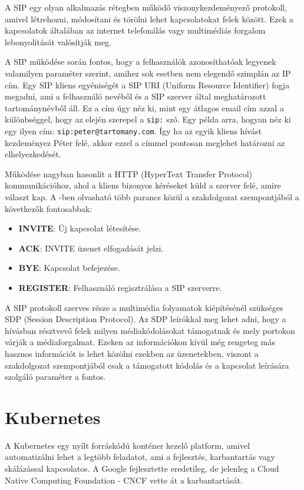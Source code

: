 A SIP egy olyan alkalmazás rétegben működő viszonykezdeményező protokoll, amivel 
létrehozni, módosítani és törölni lehet kapcsolatokat felek között. Ezek a kapcsolatok 
általában az internet telefonálás vagy multimédiás forgalom lebonyolítását valósítják meg. 

A SIP működése során fontos, hogy a felhasználók azonosíthatóak legyenek valamilyen
paraméter szerint, amihez sok esetben nem elegendő szimplán az IP cím. Egy 
SIP kliens egyéniségét a SIP URI (Uniform Resource Identifier) fogja megadni, ami
a  felhasználó nevéből és a SIP szerver által meghatározott tartománynévből áll.
Ez a cím úgy néz ki, mint egy átlagos email cím azzal a különbséggel, hogy az 
elején szerepel a \texttt{sip:} szó. Egy példa arra, hogyan néz ki egy ilyen cím: 
\texttt{sip:peter@tartomany.com}. Így ha az egyik kliens hívást kezdeményez Péter felé,
akkor ezzel a címmel pontosan meglehet határozni az elhelyezkedését. 

Működése nagyban hasonlít a HTTP (HyperText Transfer Protocol) kommunikációhoz, ahol 
a kliens bizonyos kéréseket küld a szerver felé, amire választ kap. A \cite{RFC3261}-ben
olvasható több parancs közül a szakdolgozat szempontjából a következők fontosabbak: 

\begin{itemize}
	\item \textbf{INVITE}: Új kapcsolat létesítése.
	\item \textbf{ACK}: INVITE üzenet elfogadását jelzi. 
	\item \textbf{BYE}: Kapcsolat befejezése. 
	\item \textbf{REGISTER}: Felhasználó regisztrálása a SIP szerverre. 
\end{itemize}

A SIP protokoll szerves része a multimédia folyamatok kiépítésénél szükséges SDP (Session 
Description Protocol). Az SDP leírókkal meg lehet adni, hogy a hívásban résztvevő felek 
milyen médiakódolásokat támogatnak és mely portokon várják a médiaforgalmat. Ezeken az 
információkon kívül még rengeteg más hasznos információt is lehet közölni ezekben az 
üzenetekben, viszont a szakdolgozat szempontjából csak a támogatott kódolás és a 
kapcsolat leírására szolgáló paraméter a fontos.

\section{Kubernetes}

A Kubernetes egy nyílt forráskódú konténer kezelő platform, amivel automatizálni
lehet a legtöbb feladatot, ami a fejlesztés, karbantartás vagy skálázással 
kapcsolatos. A Google fejlesztette eredetileg, de jelenleg a Cloud Native
Computing Foundation - CNCF vette át a karbantartását. 

